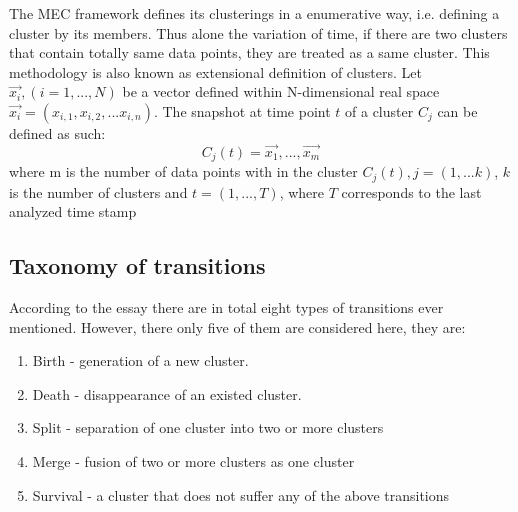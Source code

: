 \documentclass{sig-alternate}
\begin{document}
The MEC framework defines its clusterings in a enumerative way, i.e. defining a cluster by its members. Thus alone the variation of time, if there are two clusters that contain totally same data points, they are treated as a same cluster. This methodology is also known as extensional definition of clusters. Let $\vec{x_i},(i=1,...,N)$ be a vector defined within N-dimensional real space $\vec{x_i}=(x_{i,1},x_{i,2},...x_{i,n})$. The snapshot at time point $t$ of a cluster $C_j$ can be defined as such:
    \begin{displaymath}
      C_j(t)={\vec{x_1},...,\vec{x_m}}
    \end{displaymath}
where m is the number of data points with in the cluster $C_j(t),j=(1,...k)$, $k$ is the number of clusters and $t=(1,...,T)$, where $T$ corresponds to the last analyzed time stamp
\subsection{Taxonomy of transitions}
According to the essay there are in total eight types of transitions ever mentioned\cite{SPILIOPOULOU:transition}\cite{FALKOWSKI:socialnet}\cite{YANG:spatiotemporal}\cite{AGGARWAL:diagnosis}\cite{CHEN:change}\cite{AGGARWAL:diagnosis}\cite{LI:entropy}\cite{KAUR:concept}\cite{ASUR:event}. However, there only five of them are considered here, they are:
\begin{enumerate}
  \item Birth       - generation of a new cluster.
  \item Death       - disappearance of an existed cluster.
  \item Split       - separation of one cluster into two or more clusters
  \item Merge       - fusion of two or more clusters as one cluster
  \item Survival    - a cluster that does not suffer any of the above transitions
\end{enumerate}
\end{document}
